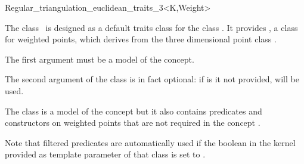 

\begin{ccRefClass}{Regular_triangulation_euclidean_traits_3<K,Weight>}  %


\ccDefinition
  
The class \ccRefName\ is designed as a default traits class for the
class . 
It provides , a class for weighted points, which derives
from the three dimensional point class .

The first argument  must be a model of the  concept. 

The second argument  of the class
 is in fact
optional: if is it not provided,  will be used.

The class is a model of the concept 
but it also contains predicates and constructors on weighted points
that are not required in the
concept .

Note that filtered predicates are automatically used if the 
boolean  in the kernel provided as template parameter 
of that class is set to .


 



\ccIsModel
{}


\end{ccRefClass}
